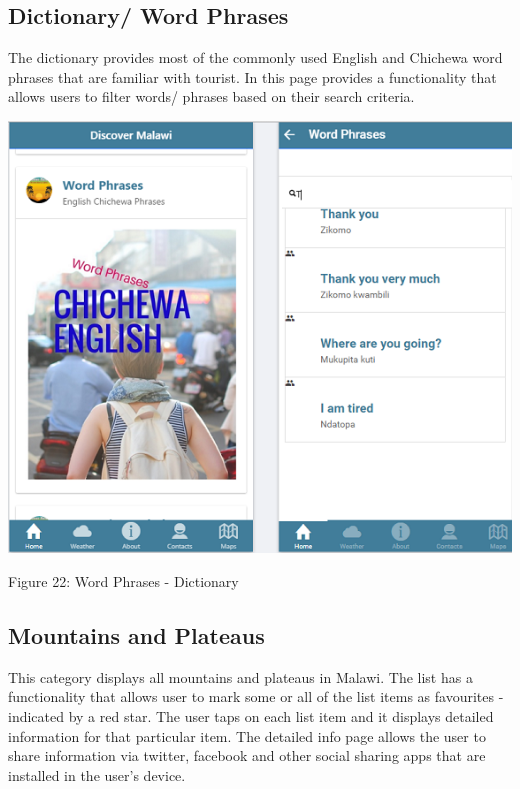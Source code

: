 \subsection{Dictionary/ Word Phrases}
The dictionary provides most of the commonly used English and Chichewa word phrases that are familiar with tourist. In this page provides a functionality that allows users to filter words/ phrases based on their search criteria. 

\begin{center}    
	\includegraphics{img/dictionary.png}
\end{center}
\begin{center}
	Figure 22: Word Phrases - Dictionary 
\end{center}
\paragraph{}

\subsection{Mountains and Plateaus}
This category displays all mountains and plateaus in Malawi. The list has a functionality that allows user to mark some or all of the list items as favourites - indicated by a red star. The user taps on each list item and it displays detailed information for that particular item. The detailed info page allows the user to share information via twitter, facebook and other social sharing apps that are installed in the user’s device.


